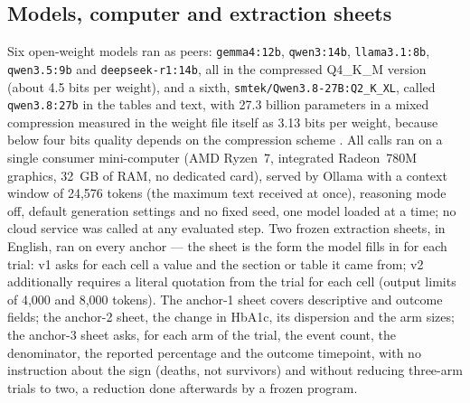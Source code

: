 \documentclass[11pt]{article}
\begin{document}
\subsection{Models, computer and extraction sheets}
Six open-weight models ran as peers: \texttt{gemma4:12b}, \texttt{qwen3:14b}, \texttt{llama3.1:8b}, \texttt{qwen3.5:9b} and \texttt{deepseek-r1:14b}, all in the compressed Q4\_K\_M version (about 4.5 bits per weight), and a sixth, \texttt{smtek/Qwen3.8-27B:\allowbreak Q2\_K\_XL}, called \texttt{qwen3.8:27b} in the tables and text, with 27.3 billion parameters in a mixed compression measured in the weight file itself as 3.13 bits per weight, because below four bits quality depends on the compression scheme \citep{dettmers2023fourbit}. All calls ran on a single consumer mini-computer (AMD Ryzen~7, integrated Radeon~780M graphics, 32~GB of RAM, no dedicated card), served by Ollama with a context window of 24,576 tokens (the maximum text received at once), reasoning mode off, default generation settings and no fixed seed, one model loaded at a time; no cloud service was called at any evaluated step. Two frozen extraction sheets, in English, ran on every anchor --- the sheet is the form the model fills in for each trial: v1 asks for each cell a value and the section or table it came from; v2 additionally requires a literal quotation from the trial for each cell (output limits of 4,000 and 8,000 tokens). The anchor-1 sheet covers descriptive and outcome fields; the anchor-2 sheet, the change in HbA1c, its dispersion and the arm sizes; the anchor-3 sheet asks, for each arm of the trial, the event count, the denominator, the reported percentage and the outcome timepoint, with no instruction about the sign (deaths, not survivors) and without reducing three-arm trials to two, a reduction done afterwards by a frozen program.
\end{document}
